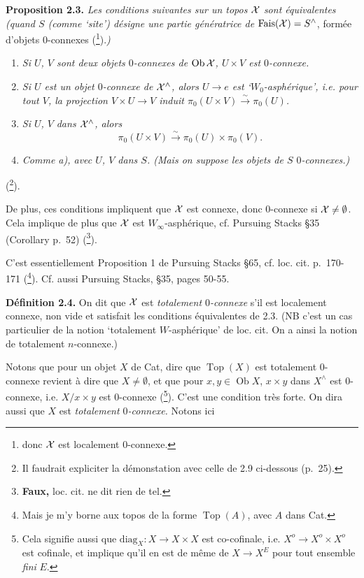 \noindent\textbf{Proposition 2.3.} \textit{Les conditions suivantes sur un topos $\mathcal{X}$ sont équivalentes (quand $S$ (comme `site') désigne une partie génératrice de} $\mathrm{Fais}(\mathcal{X}) = S^{\wedge}$, formée d'objets 0-connexes (\footnote[23]{donc $\mathcal{X}$ est localement 0-connexe.}).\textit{)}
\begin{enumerate}[label={},leftmargin=3em]
\item[\textit{a)}] \textit{Si $U$, $V$ sont deux objets $0$-connexes de $\operatorname{Ob} \mathcal{X}$, $U \times V$ est $0$-connexe.}
\item[\textit{b)}] \textit{Si $U$ est un objet $0$-connexe de $\mathcal{X}^{\wedge}$, alors $U \longrightarrow e$ est `$W_0$-asphérique', i.e. pour tout $V$, la projection $V \times U \longrightarrow V$ induit $\pi_0(U \times V) \xrightarrow{\sim} \pi_0(U)$.}
\item[\textit{c)}] \textit{Si $U$, $V$} \textit{dans $\mathcal{X}^{\wedge}$, alors}
\[
\pi_0(U \times V) \xrightarrow{\sim} \pi_0(U) \times \pi_0(V).
\]
\item[\textit{d)}] \textit{Comme a), avec $U$, $V$ dans $S$. (Mais on suppose les objets de $S$ $0$-connexes.)}
\end{enumerate}
\noindent(\footnote[24]{Il faudrait expliciter la démonstation avec celle de 2.9 ci-dessous (p.~25).}). %


\noindent De plus, ces conditions impliquent que $\mathcal{X}$ est connexe, donc 0-connexe si $\mathcal{X} \neq \emptyset$. Cela implique de plus que $\mathcal{X}$ est $W_{\infty}$-asphérique, cf. Pursuing Stacks §35 (Corollary p.~52) (\footnote[25]{\textbf{Faux,} loc. cit. ne dit rien de tel.}).

C'est essentiellement Proposition 1 de Pursuing Stacks §65, cf. loc. cit. p.~170-171 (\footnote[26]{Mais je m'y borne aux topos de la forme $\operatorname{Top}(A)$, avec $A$ dans Cat.}). Cf. aussi Pursuing Stacks, §35, pages 50-55.


\noindent\textbf{Définition 2.4.} On dit que $\mathcal{X}$ est \textit{totalement $0$-connexe} s'il est localement connexe, non vide et satisfait les conditions équivalentes de 2.3. (NB c'est un cas particulier de la notion `totalement $W$-asphérique' de loc. cit. On a ainsi la notion de totalement $n$-connexe.)

Notons que pour un objet $X$ de Cat, dire que $\operatorname{Top}(X)$ est totalement 0-connexe revient à dire que $X \neq \emptyset$, et que pour $x, y \in \operatorname{Ob} X$, $x \times y$ dans $X^{\wedge}$ est 0-connexe, i.e. $X/x \times y$ est 0-connexe (\footnote[27]{Cela signifie aussi que $\mathrm{diag}_X : X \longrightarrow X \times X$ est co-cofinale, i.e. $X^o \longrightarrow X^o \times X^o$ est cofinale, et implique qu'il en est de même de $X \longrightarrow X^E$ pour tout ensemble \textit{fini} $E$.}). C'est une condition très forte. On dira aussi que $X$ est \textit{totalement $0$-connexe.} Notons ici

